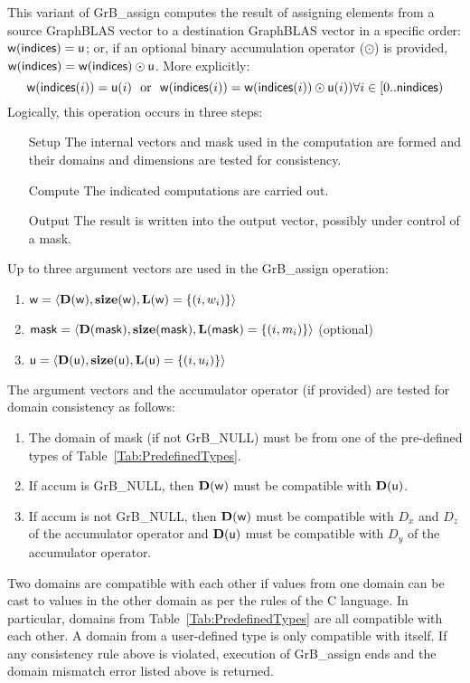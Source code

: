 This variant of {\sf GrB\_assign} computes the result of assigning elements from 
a source GraphBLAS vector to a destination GraphBLAS vector in a specific order: 
${\sf w}({\sf indices}) = {\sf u}$; or, if an optional binary accumulation 
operator ($\odot$) is provided, ${\sf w}({\sf indices}) = {\sf w}({\sf indices}) \odot {\sf u}$.  
More explicitly:
\[
	{\sf w}({\sf indices}(i)) = {\sf u}(i) \mbox{~~or~~} 
    {\sf w}({\sf indices}(i)) = {\sf w}({\sf indices}(i)) \odot {\sf u}(i))
    \forall i \in \left[0..{\sf nindices}\right)
\]  
Logically, this operation occurs in three steps:
\begin{enumerate}[leftmargin=0.75in]
\item[Setup] The internal vectors and mask used in the computation are formed 
and their domains and dimensions are tested for consistency.
\item[Compute] The indicated computations are carried out.
\item[Output] The result is written into the output vector, possibly under 
control of a mask.
\end{enumerate}

Up to three argument vectors are used in the {\sf GrB\_assign} operation:
\begin{enumerate}
	\item ${\sf w} = \langle \bold{D}({\sf w}),\bold{size}({\sf w}),\bold{L}({\sf w}) = \{(i,w_i) \} \rangle$
	\item ${\sf mask} = \langle \bold{D}({\sf mask}),\bold{size}({\sf mask}),\bold{L}({\sf mask}) = \{(i,m_i) \} \rangle$ (optional)
	\item ${\sf u} = \langle \bold{D}({\sf u}),\bold{size}({\sf u}),\bold{L}({\sf u}) = \{(i,u_i) \} \rangle$
\end{enumerate}

The argument vectors and the accumulator 
operator (if provided) are tested for domain consistency as follows:
\begin{enumerate}
	\item The domain of {\sf mask} (if not {\sf GrB\_NULL}) must be from one of the pre-defined types of Table~\ref{Tab:PredefinedTypes}.

	\item If {\sf accum} is {\sf GrB\_NULL}, then $\bold{D}({\sf w})$ must be 
    compatible with $\bold{D}({\sf u})$.

	\item If {\sf accum} is not {\sf GrB\_NULL}, then $\bold{D}({\sf w})$ must be
    compatible with $D_x$ and $D_z$ of the accumulator operator and 
    $\bold{D}({\sf u})$ must be compatible with $D_y$ of the accumulator operator.
\end{enumerate}
Two domains are compatible with each other if values from one domain can be cast 
to values in the other domain as per the rules of the C language.
In particular, domains from Table~\ref{Tab:PredefinedTypes} are all compatible 
with each other. A domain from a user-defined type is only compatible with itself.
If any consistency rule above is violated, execution of {\sf GrB\_assign} ends
and the domain mismatch error listed above is returned.

